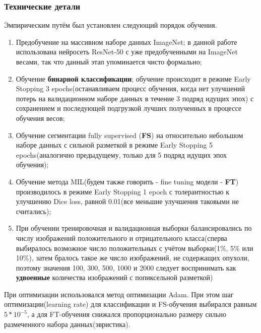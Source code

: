 \subsubsection{Технические детали}

\noindent Эмпирическим путём был установлен следующий порядок обучения.

\begin{enumerate}

	\item Предобучение на массивном наборе данных ImageNet; в данной работе использована нейросеть ResNet-50 с уже предобученными на ImageNet весами,
	так что данный этап упоминается чисто формально;

	\item Обучение {\bf бинарной классификации}; обучение происходит в режиме Early Stopping 3 epochs(останавливаем процесс обучения, когда 
	нет улучшений потерь на валидационном наборе данных в течение 3 подряд идущих эпох) с сохранением и последующей подгрузкой лучших полученных в процессе обучения весов;
	
	\item Обучение сегментации fully supervised ({\bf FS}) на относительно небольшом наборе данных с сильной разметкой в режиме Early Stopping 5 epochs(аналогично предыдущему, только для 5 подряд идущих 
	эпох обучения);
	
	\item Обучение метода MIL(будем также говорить - fine tuning модели - {\bf FT}) производилось в режиме Early Stopping 1 epoch с толерантностью к улучшению Dice loss, равной 0.01(все меньшие улучшения таковыми не считались);
	
	\item При обучении тренировочная и валидационная выборки балансировались по числу изображений положительного и отрицательного класса(сперва выбиралось возможное число положительных с учётом выборки(1\%, 5\% или 10\%), затем бралось такое же число изображений, не содержащих опухоли, поэтому значения 100, 300, 500, 1000 и 2000 следует воспринимать как {\bf удвоенные} количества изображений с попиксельной разметкой)

\end{enumerate}

При оптимизации использовался метод оптимизации Adam. При этом шаг оптимизации(learning rate) для классификации и FS-обучения выбирался равным $5*10^{-5}$, а для FT-обучения снижался пропорционально размеру сильно размеченного набора данных(эвристика).


